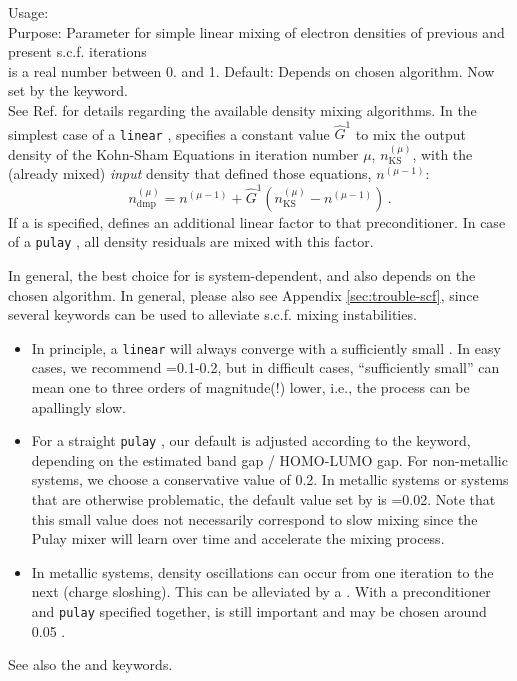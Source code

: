 {
  \noindent
  Usage:   \\[1.0ex]
  Purpose: Parameter for simple linear mixing of electron densities of
    previous and present s.c.f. iterations \\[1.0ex]
   is a real number between 0. and 1. Default: Depends
    on chosen  algorithm. Now set by the
     keyword. \\
}
See Ref. \cite{Blum08} for details regarding the available density
mixing algorithms. In the simplest case of a \texttt{linear}
,  specifies a constant value $\hat{G}^1$
to mix the output density of the Kohn-Sham Equations in iteration
number $\mu$, $n_\text{KS}^{(\mu)}$, with the (already mixed)
\emph{input} density that defined those equations, $n^{(\mu-1)}$:
\begin{equation}\label{Eq:dmp}
  n^{(\mu)}_\text{dmp} = n^{(\mu-1)} + \hat{G}^1
  (n_\text{KS}^{(\mu)}- n^{(\mu-1)}) \, .
\end{equation}
If a  is specified,
 defines an additional linear factor to
that preconditioner. In case of a \texttt{pulay} , all
density residuals are mixed with this factor.

In general, the best choice for  is system-dependent,
and also depends on the chosen  algorithm. In general,
please also see Appendix \ref{sec:trouble-scf}, since several keywords
can be used to alleviate s.c.f. mixing instabilities.
\begin{itemize}
  \item In principle, a \texttt{linear}  will always
    converge with a sufficiently small . In easy cases,
    we recommend =0.1-0.2, but in difficult cases,
    ``sufficiently small'' can mean one to three orders of magnitude(!)
    lower, i.e., the process can be apallingly slow.
  \item For a straight \texttt{pulay} , our default
     is adjusted according to the 
    keyword, depending on the estimated band gap / HOMO-LUMO gap. For
    non-metallic systems, we choose a conservative value of 0.2. In
    metallic systems or systems that are otherwise problematic, the
    default value set by  is
    =0.02. Note that
    this small value does not necessarily correspond to slow mixing
    since the Pulay mixer will learn over time and accelerate
    the mixing process.
  \item In metallic systems, density oscillations can occur from one
    iteration to the next (charge sloshing). This can be alleviated by
    a . With a preconditioner and
    \texttt{pulay}  specified together, 
    is still important and may be chosen around 0.05 .
\end{itemize}
See also the  and 
keywords.

